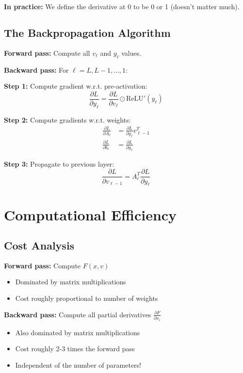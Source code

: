 \documentclass[11pt]{article}
\begin{document}
\textbf{In practice:} We define the derivative at 0 to be 0 or 1 (doesn't matter much).

\subsection{The Backpropagation Algorithm}
\textbf{Forward pass:} Compute all $v_\ell$ and $y_\ell$ values.

\textbf{Backward pass:} For $\ell = L, L-1, \ldots, 1$:

\textbf{Step 1:} Compute gradient w.r.t. pre-activation:
\begin{equation}
\frac{\partial L}{\partial y_\ell} = \frac{\partial L}{\partial v_\ell} \odot \text{ReLU}'(y_\ell)
\end{equation}

\textbf{Step 2:} Compute gradients w.r.t. weights:
\begin{align}
\frac{\partial L}{\partial A_\ell} &= \frac{\partial L}{\partial y_\ell} v_{\ell-1}^T\\
\frac{\partial L}{\partial b_\ell} &= \frac{\partial L}{\partial y_\ell}
\end{align}

\textbf{Step 3:} Propagate to previous layer:
\begin{equation}
\frac{\partial L}{\partial v_{\ell-1}} = A_\ell^T \frac{\partial L}{\partial y_\ell}
\end{equation}

\section{Computational Efficiency}

\subsection{Cost Analysis}
\textbf{Forward pass:} Compute $F(x,v)$
\begin{itemize}
\item Dominated by matrix multiplications
\item Cost roughly proportional to number of weights
\end{itemize}

\textbf{Backward pass:} Compute all partial derivatives $\frac{\partial F}{\partial x_i}$
\begin{itemize}
\item Also dominated by matrix multiplications
\item Cost roughly 2-3 times the forward pass
\item Independent of the number of parameters!
\end{itemize}
\end{document}
